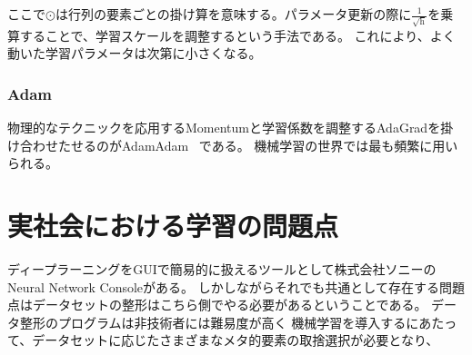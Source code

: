 ここで$ \odot $は行列の要素ごとの掛け算を意味する。パラメータ更新の際に$ \frac{ 1 }{\sqrt{\mathrm{h}}} $を乗算することで、学習スケールを調整するという手法である。
これにより、よく動いた学習パラメータは次第に小さくなる。



\subsubsection{Adam}
物理的なテクニックを応用するMomentumと学習係数を調整するAdaGradを掛け合わせたせるのがAdamAdam~\cite{adam} である。
機械学習の世界では最も頻繁に用いられる。




\section{実社会における学習の問題点}

ディープラーニングをGUIで簡易的に扱えるツールとして株式会社ソニーのNeural Network Consoleがある。
しかしながらそれでも共通として存在する問題点はデータセットの整形はこちら側でやる必要があるということである。
データ整形のプログラムは非技術者には難易度が高く
機械学習を導入するにあたって、データセットに応じたさまざまなメタ的要素の取捨選択が必要となり、
